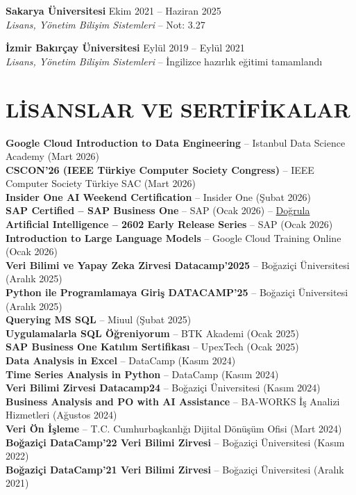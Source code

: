 \documentclass[a4paper,8pt]{article}
\begin{document}
\vspace{3pt}

\textbf{Sakarya Üniversitesi} \hfill {\small Ekim 2021 -- Haziran 2025}\\
{\small \textit{Lisans, Yönetim Bilişim Sistemleri} -- Not: 3.27}

\vspace{3pt}

\textbf{İzmir Bakırçay Üniversitesi} \hfill {\small Eylül 2019 -- Eylül 2021}\\
{\small \textit{Lisans, Yönetim Bilişim Sistemleri} -- İngilizce hazırlık eğitimi tamamlandı}

\section{LİSANSLAR VE SERTİFİKALAR}
{\small
\textbf{Google Cloud Introduction to Data Engineering} -- Istanbul Data Science Academy (Mart 2026)\\
\textbf{CSCON'26 (IEEE Türkiye Computer Society Congress)} -- IEEE Computer Society Türkiye SAC (Mart 2026)\\
\textbf{Insider One AI Weekend Certification} -- Insider One (Şubat 2026)\\
\textbf{SAP Certified -- SAP Business One} -- SAP (Ocak 2026) -- \href{https://www.credly.com/badges/149da554-e1b6-477d-a063-f3c7997625c2/linked_in_profile}{Doğrula}\\
\textbf{Artificial Intelligence -- 2602 Early Release Series} -- SAP (Ocak 2026)\\
\textbf{Introduction to Large Language Models} -- Google Cloud Training Online (Ocak 2026)\\
\textbf{Veri Bilimi ve Yapay Zeka Zirvesi Datacamp'2025} -- Boğaziçi Üniversitesi (Aralık 2025)\\
\textbf{Python ile Programlamaya Giriş DATACAMP'25} -- Boğaziçi Üniversitesi (Aralık 2025)\\
\textbf{Querying MS SQL} -- Miuul (Şubat 2025)\\
\textbf{Uygulamalarla SQL Öğreniyorum} -- BTK Akademi (Ocak 2025)\\
\textbf{SAP Business One Katılım Sertifikası} -- UpexTech (Ocak 2025)\\
\textbf{Data Analysis in Excel} -- DataCamp (Kasım 2024)\\
\textbf{Time Series Analysis in Python} -- DataCamp (Kasım 2024)\\
\textbf{Veri Bilimi Zirvesi Datacamp24} -- Boğaziçi Üniversitesi (Kasım 2024)\\
\textbf{Business Analysis and PO with AI Assistance} -- BA-WORKS İş Analizi Hizmetleri (Ağustos 2024)\\
\textbf{Veri Ön İşleme} -- T.C. Cumhurbaşkanlığı Dijital Dönüşüm Ofisi (Mart 2024)\\
\textbf{Boğaziçi DataCamp'22 Veri Bilimi Zirvesi} -- Boğaziçi Üniversitesi (Kasım 2022)\\
\textbf{Boğaziçi DataCamp'21 Veri Bilimi Zirvesi} -- Boğaziçi Üniversitesi (Aralık 2021)
}
\end{document}
